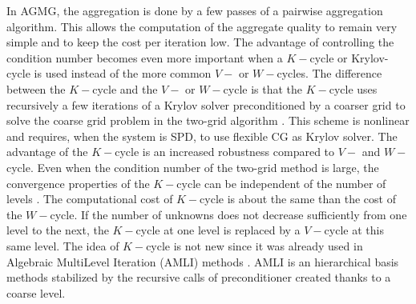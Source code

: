 In AGMG, the aggregation is done by a few passes of a pairwise aggregation 
algorithm. This allows the computation of the aggregate quality to remain very 
simple and to keep the cost per iteration low. The advantage of controlling the 
condition number becomes even more important when a $K-$cycle or Krylov-cycle is 
used instead of the more common $V-$ or $W-$cycles. The difference between the 
$K-$cycle and the $V-$ or $W-$cycle is that the $K-$cycle uses recursively a 
few iterations of a Krylov solver preconditioned by a coarser grid to solve 
the coarse grid problem in the two-grid algorithm \cite{k_cycle}. This scheme 
is nonlinear and requires, when the system is SPD, to use flexible CG 
\cite{fcg_2,fcg_3,fcg_4,fcg} as Krylov solver. The advantage of the $K-$cycle is 
an increased robustness compared to $V-$ and $W-$cycle. Even when the condition 
number of the two-grid method is large, the convergence properties of the 
$K-$cycle can be independent of the number of levels \cite{k_cycle}. The 
computational cost of $K-$cycle is about the same than the cost of the 
$W-$cycle. If the number of unknowns does not decrease sufficiently from one 
level to the next, the $K-$cycle at one level is replaced by a $V-$cycle at 
this same level. The idea of $K-$cycle is not new since it was already used 
in Algebraic MultiLevel Iteration (AMLI) methods \cite{amli}. AMLI is an 
hierarchical basis methods stabilized by the recursive calls of preconditioner 
created thanks to a coarse level. 

